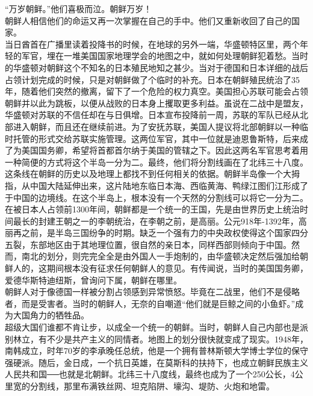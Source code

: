 “万岁朝鲜。”他们喜极而泣。朝鲜万岁！\\

朝鲜人相信他们的命运又再一次掌握在自己的手中。他们又重新收回了自己的国家。\\

当日酋首在广播里读着投降书的时候，在地球的另外一端，华盛顿特区里，两个年轻的军官，埋在一堆美国国家地理学会的地图之中，就如何处理朝鲜犯着愁。当时的华盛顿对朝鲜这个不知名的日本殖民地知之甚少。当对于德国和日本详细的战后占领计划完成的时候，只是对朝鲜做了个临时的补充。日本在朝鲜殖民统治了35年，随着他们突然的撤离，留下了一个危险的权力真空。美国担心苏联可能会占领朝鲜并以此为跳板，以便从战败的日本身上攫取更多利益。虽说在二战中是盟友，华盛顿对苏联的不信任却在与日俱增。日本宣布投降前一周，苏联的军队已经从北部进入朝鲜，而且还在继续前进。为了安抚苏联，美国人提议将北部朝鲜以一种临时托管的形式交给苏联实施管理。这两位军官，其中一位就是迪恩鲁斯特，后来成了为美国国务卿，希望将首都首尔纳于美国的管辖之下。因此这两名军官思考着用一种简便的方式将这个半岛一分为二。最终，他们将分割线画在了北纬三十八度。\\

这条线在朝鲜的历史以及地理上都找不到任何相关的依据。朝鲜半岛像一个大拇指，从中国大陆延伸出来，这片陆地东临日本海、西临黄海、鸭绿江图们江形成了于中国的边境线。在这个半岛上，根本没有一个天然的分割线可以将它一分为二。在被日本人占领前1300年间，朝鲜都是一个统一的王国，先是由世界历史上统治时间最长的封建王朝之一的李朝统治，在李朝之前，是高丽。公元918年-1392年，高丽再之前，是半岛三国纷争的时期。缺乏一个强有力的中央政权使得这个国家四分五裂，东部地区由于其地理位置，很自然的亲日本，同样西部则倾向于中国。然而，南北的划分，则完完全全是由外国人一手炮制的，由华盛顿决定然后强加给朝鲜人的，这期间根本没有征求任何朝鲜人的意见。有传闻说，当时的美国国务卿，爱德华斯特迪纽斯，曾询问下属，朝鲜在哪里。\\

朝鲜人对于像德国一样被分割占领感到异常愤怒。毕竟在二战里，他们不是侵略者，而是受害者。当时的朝鲜人，无奈的自嘲道“他们就是巨鲸之间的小鱼虾。”成为大国角力的牺牲品。\\

超级大国们谁都不肯让步，以成全一个统一的朝鲜。当时，朝鲜人自己内部也是派别林立，有不少是共产主义的同情者。地图上的划分很快就变成了现实。1948年，南韩成立，时年70岁的李承晚任总统，他是一个拥有普林斯顿大学博士学位的保守强硬派。随后，金日成，一个抗日英雄，在莫斯科的扶持下，也成立朝鲜民族主义人民共和国──也就是北朝鲜。北纬三十八度线，最终也成为了一个250公长，4公里宽的分割线，那里布满铁丝网、坦克陷阱、壕沟、堤防、火炮和地雷。\\

